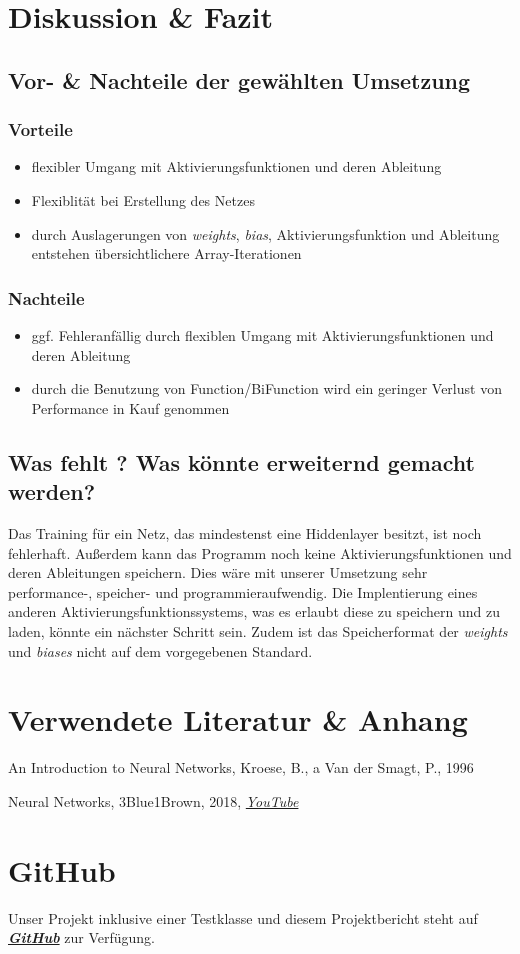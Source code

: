 \documentclass[paper=A4,pagesize=auto,12pt,headinclude=true,footinclude=true,BCOR=0mm,DIV=calc]{scrartcl}
\begin{document}
\newpage

\section{Diskussion \& Fazit}

\subsection{Vor- \& Nachteile der gewählten Umsetzung}
\subsubsection{Vorteile}
\begin{itemize}
	\item flexibler Umgang mit Aktivierungsfunktionen und deren Ableitung
	\item Flexiblität bei Erstellung des Netzes
	\item durch Auslagerungen von \textit{weights}, \textit{bias}, Aktivierungsfunktion und Ableitung entstehen übersichtlichere Array-Iterationen
\end{itemize}
\subsubsection{Nachteile}
\begin{itemize}
	\item ggf. Fehleranfällig durch flexiblen Umgang mit Aktivierungsfunktionen und deren Ableitung
	\item durch die Benutzung von Function/BiFunction wird ein geringer Verlust von Performance in Kauf genommen
\end{itemize}
\subsection{Was fehlt ? Was könnte erweiternd gemacht werden?}
Das Training für ein Netz, das mindestenst eine Hiddenlayer besitzt, ist noch fehlerhaft. Außerdem kann das Programm noch keine Aktivierungsfunktionen und deren Ableitungen speichern.
Dies wäre mit unserer Umsetzung sehr performance-, speicher- und programmieraufwendig. Die Implentierung eines anderen Aktivierungsfunktionssystems, was es erlaubt diese zu speichern und zu laden, könnte ein nächster Schritt sein.
Zudem ist das Speicherformat der \textit{weights} und \textit{biases} nicht auf dem vorgegebenen Standard.
\newpage

\section{Verwendete Literatur \& Anhang}
\begin{itemize}
	\item{An Introduction to Neural Networks, Kroese, B., a Van der Smagt, P., 1996}
	\hypertarget{3b1b}{\item{Neural Networks, 3Blue1Brown, 2018, \hyperref{https://www.youtube.com/playlist?list=PLZHQObOWTQDNU6R1_67000Dx_ZCJB-3pi}{}{}{\textit{YouTube}}}}
\end{itemize}

\vspace{1cm}

\section{GitHub}
Unser Projekt inklusive einer Testklasse und diesem Projektbericht steht auf \hyperref{https://github.com/Griszder/ProjektSeminar.git}{}{}{\textit{\textbf{GitHub}}} zur Verfügung.
\end{document}

